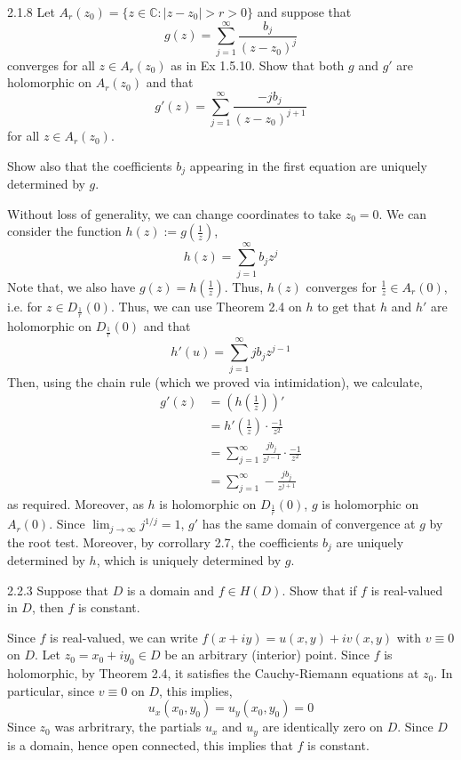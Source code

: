 \documentclass[12pt]{amsart}
\begin{document}
\begin{problem}{2.1.8}
Let \( A_r(z_0) = \{ z \in \mathbb{C} : |z - z_0| > r > 0 \} \) and suppose that
\[ g(z) = \sum_{j=1}^{\infty} \frac{b_j}{(z - z_0)^j} \]
converges for all \( z \in A_r(z_0) \) as in Ex 1.5.10. Show that both \( g \) and \( g' \) are holomorphic on \( A_r(z_0) \) and that
\[ g'(z) = \sum_{j=1}^{\infty} \frac{-j b_j}{(z - z_0)^{j+1}} \]
for all \( z \in A_r(z_0) \).

Show also that the coefficients \( b_j \) appearing in the first equation are uniquely determined by \( g \).
\end{problem}
\begin{solution}
    Without loss of generality, we can change coordinates to take $z_0 = 0$. We can consider the function $h(z) := g\left(\frac{1}{z}\right)$, 
    \[ h(z) = \sum_{j=1}^\infty b_jz^j\]
    Note that, we also have $g(z) = h\left(\frac{1}{z}\right)$. Thus, $h(z)$ converges 
    for $\frac{1}{z} \in A_r(0)$, i.e. for $z \in D_{\frac{1}{r}}(0)$. Thus, we can use Theorem 2.4 on $h$ to get that $h$ and $h'$ are holomorphic on $D_{\frac{1}{r}}(0)$ and that
    \[ h'(u) = \sum_{j=1}^\infty jb_jz^{j-1}\]
    Then, using the chain rule (which we proved via intimidation), we calculate, 
    \begin{align*}
        g'(z) &= \left(h\left(\frac{1}{z}\right)\right)' \\
        &= h'\left(\frac{1}{z}\right) \cdot \frac{-1}{z^2} \\
        &= \sum_{j=1}^\infty \frac{jb_j}{z^{j-1}} \cdot \frac{-1}{z^2} \\
        &= \sum_{j=1}^\infty -\frac{jb_j}{z^{j+1}}
    \end{align*}
    as required. Moreover, as $h$ is holomorphic on $D_{\frac{1}{r}}(0)$, $g$ is holomorphic on $A_r(0)$. Since $\lim_{j \to \infty} j^{1/j} = 1$, $g'$ has the same domain of convergence at $g$ by the root test. Moreover, by corrollary 2.7, the coefficients $b_j$ are uniquely determined by $h$, which is uniquely determined by $g$. 
\end{solution}
\newpage 
\begin{problem}{2.2.3}
    Suppose that $D$ is a domain and $f \in H(D)$. Show that if $f$ is real-valued in $D$, then $f$ is constant. 
\end{problem}
\begin{solution}
    Since $f$ is real-valued, we can write $f(x+iy) = u(x,y) + iv(x,y)$ with $v \equiv 0$ on $D$. Let $z_0 = x_0 + iy_0 \in D$ be an arbitrary (interior) point. Since $f$ is holomorphic, by Theorem 2.4, it satisfies the Cauchy-Riemann equations at $z_0$. In particular, since $v \equiv 0$ on $D$, this implies, 
    \[ u_x(x_0, y_0) = u_y(x_0, y_0) = 0\] 
    Since $z_0$ was arbritrary, the partials $u_x$ and $u_y$ are identically zero on $D$. Since $D$ is a domain, hence open connected, this implies that $f$ is constant.
\end{solution}
\newpage 
\end{document}
